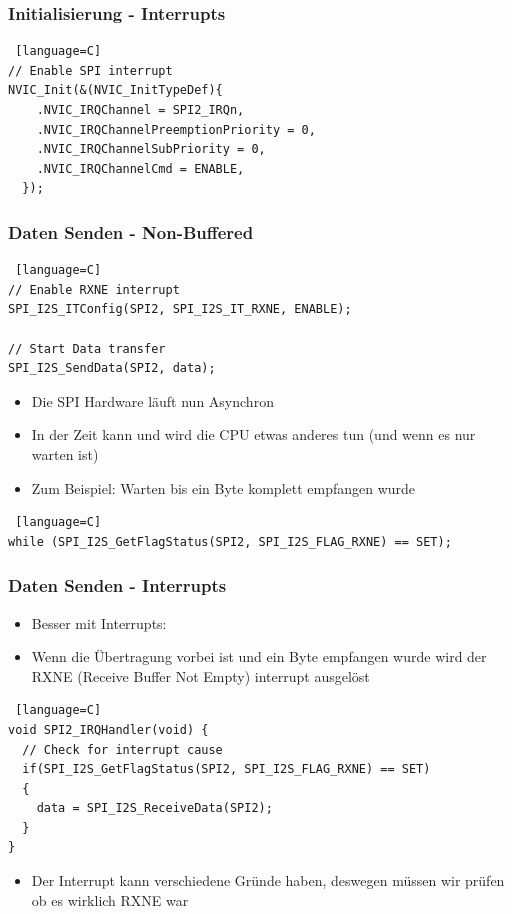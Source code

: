 \documentclass[ngerman,compress]{beamer}
\begin{document}
\begin{frame} [fragile]
	\frametitle{Initialisierung - Interrupts}
	\begin{lstlisting} [language=C]
// Enable SPI interrupt
NVIC_Init(&(NVIC_InitTypeDef){
    .NVIC_IRQChannel = SPI2_IRQn,
    .NVIC_IRQChannelPreemptionPriority = 0,
    .NVIC_IRQChannelSubPriority = 0,
    .NVIC_IRQChannelCmd = ENABLE,
  });
	\end{lstlisting}
\end{frame}

\begin{frame} [fragile]
	\frametitle{Daten Senden - Non-Buffered}
	\begin{lstlisting} [language=C]
// Enable RXNE interrupt
SPI_I2S_ITConfig(SPI2, SPI_I2S_IT_RXNE, ENABLE);

// Start Data transfer
SPI_I2S_SendData(SPI2, data);
	\end{lstlisting}
	\begin{itemize}
		\item Die SPI Hardware läuft nun Asynchron
		\item In der Zeit kann und wird die CPU etwas anderes tun (und wenn es nur warten ist)
		\item Zum Beispiel: Warten bis ein Byte komplett empfangen wurde
	\end{itemize}
	\begin{lstlisting} [language=C]
while (SPI_I2S_GetFlagStatus(SPI2, SPI_I2S_FLAG_RXNE) == SET);
	\end{lstlisting}
\end{frame}

\begin{frame} [fragile]
	\frametitle{Daten Senden - Interrupts}
	\begin{itemize}
		\item Besser mit Interrupts:
		\item Wenn die Übertragung vorbei ist und ein Byte empfangen wurde wird der RXNE
			(Receive Buffer Not Empty) interrupt ausgelöst
	\end{itemize}
	\begin{lstlisting} [language=C]
void SPI2_IRQHandler(void) {
  // Check for interrupt cause
  if(SPI_I2S_GetFlagStatus(SPI2, SPI_I2S_FLAG_RXNE) == SET)
  {
    data = SPI_I2S_ReceiveData(SPI2);
  }
}
	\end{lstlisting}
	\begin{itemize}
		\item Der Interrupt kann verschiedene Gründe haben, deswegen müssen wir prüfen ob es
			wirklich RXNE war
	\end{itemize}
\end{frame}
\end{document}
